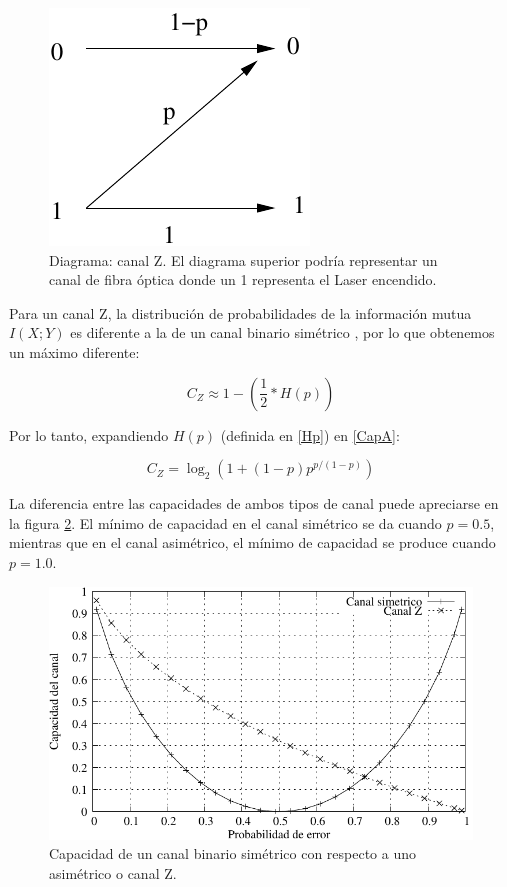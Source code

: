 \begin{figure}[th]
  \begin{center}
    \includegraphics[scale=1]{graphs/zchannel}
  \end{center}
  \caption{Diagrama: canal Z. El diagrama superior podría representar un canal de fibra óptica donde un 1 representa el Laser encendido.}
  \label{fig:Gal}
\end{figure}

Para un canal Z, la distribución de probabilidades de la información mutua $I(X;Y)$ es diferente a la de un canal binario simétrico \cite{Tallini:02}, por lo que obtenemos un máximo diferente:

\begin{equation}\label{CapA}
C_{Z} \approx 1 - \left(\frac{1}{2}*H(p)\right)
\end{equation}

Por lo tanto, expandiendo $H(p)$ (definida en \ref{Hp}) en \ref{CapA}:

$$ C_{Z} = \log_2\left(1+(1-p) p^{p/(1-p)}\right) $$

La diferencia entre las capacidades de ambos tipos de canal puede apreciarse en la figura \ref{fig:CompBZ}. El mínimo de capacidad en el canal simétrico se da cuando $p=0.5$, mientras que en el canal asimétrico, el mínimo de capacidad se produce cuando $p=1.0$.

\begin{figure}[th]
  \begin{center}
    \includegraphics[scale=1.1]{graphs/grafico_comparacion_capacidad_binaria_z}
  \end{center}
  \caption{Capacidad de un canal binario simétrico con respecto a uno asimétrico o canal Z.}
  \label{fig:CompBZ}
\end{figure}


